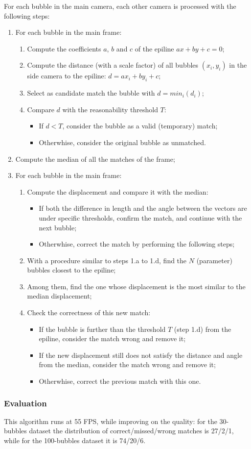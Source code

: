 For each bubble in the main camera, each other camera is processed with the following steps:
\begin{enumerate}
	\itemsep 0em
	\item For each bubble in the main frame:
	      \begin{enumerate}
		      \item Compute the coefficients $a$, $b$ and $c$ of the epiline $ax+by+c{=}0$;
		      \item Compute the distance (with a scale factor) of all bubbles $(x_i, y_i)$ in the side camera to the epiline: $d = ax_i + by_i + c$;
		      \item Select as candidate match the bubble with $d=min_i(d_i)$;
		      \item Compare $d$ with the reasonability threshold $T$:
		            \begin{itemize}
			            \item If $d<T$, consider the bubble as a valid (temporary) match;
			            \item Otherwhise, consider the original bubble as unmatched.
		            \end{itemize}
	      \end{enumerate}
	\item Compute the median of all the matches of the frame;
	\item For each bubble in the main frame:
	      \begin{enumerate}
		      \item Compute the displacement and compare it with the median:
		            \begin{itemize}
			            \item If both the difference in length and the angle between the vectors are under specific thresholds, confirm the match, and continue with the next bubble;
			            \item Otherwhise, correct the match by performing the following steps;
		            \end{itemize}
		      \item With a procedure similar to steps 1.a to 1.d, find the $N$ (parameter) bubbles closest to the epiline;
		      \item Among them, find the one whose displacement is the most similar to the median displacement;
		      \item Check the correctness of this new match:
		      \begin{itemize}
				\item If the bubble is further than the threshold $T$ (step 1.d) from the epiline, consider the match wrong and remove it;
				\item If the new displacement still does not satisfy the distance and angle from the median, consider the match wrong and remove it;
				\item Otherwhise, correct the previous match with this one.
			  \end{itemize}
	      \end{enumerate}
\end{enumerate}

\subsubsection{Evaluation}

This algorithm runs at 55 FPS, while improving on the quality: for the 30-bubbles dataset the distribution of correct/missed/wrong matches is 27/2/1, while for the 100-bubbles dataset it is 74/20/6.
